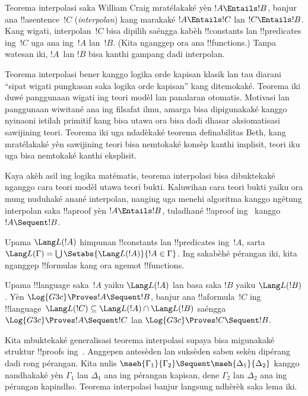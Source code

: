 \documentclass[../../../include/open-logic-section]{subfiles}
\begin{document}


Teorema interpolasi saka William Craig mratélakaké yèn
$!A \Entails !B$, banjur ana !!a{sentence}~$!C$
(\emph{interpolan}) kang marakaké $!A \Entails !C$ lan
$!C \Entails !B$. Kang wigati, interpolan~$!C$ bisa
dipilih saéngga kabèh !!{constant}s lan !!{predicate}s
ing~$!C$ uga ana ing~$!A$ lan~$!B$.
(Kita nganggep ora ana !!{function}s.) Tanpa watesan iki,
$!A$~lan $!B$ bisa kanthi gampang dadi interpolan.

Teorema interpolasi bener kanggo logika orde kapisan klasik
lan tau diarani ``sipat wigati pungkasan saka logika orde
kapisan'' kang ditemokaké. Teorema iki duwé panggunaan
wigati ing teori modèl lan panalaran otomatis.
Motivasi lan panggunaan wiwitané ana ing filsafat ilmu,
amarga bisa dipigunakaké kanggo nyinaoni istilah primitif
kang bisa utawa ora bisa dadi dhasar aksiomatisasi sawijining
teori. Teorema iki uga ndadèkaké teorema definabilitas Beth,
kang mratélakaké yèn sawijining teori bisa nemtokaké konsèp
kanthi implisit, teori iku uga bisa nemtokaké kanthi eksplisit.

Kaya akèh asil ing logika matématis, teorema interpolasi
bisa dibuktekaké nganggo cara teori modèl utawa teori bukti.
Kaluwihan cara teori bukti yaiku ora mung nuduhaké anané
interpolan, nanging uga menehi algoritma kanggo ngétung
interpolan saka !!a{proof} yèn $!A \Entails !B$,
tuladhané !!a{proof} ing~ kanggo
$!A \Sequent !B$.

Upama $\Lang L(!A)$ himpunan !!{constant}s lan
!!{predicate}s ing~$!A$, sarta
$\Lang L(\Gamma) = \bigcup \Setabs{\Lang L(!A)}{!A \in
\Gamma}$. Ing sakabèhé pérangan iki, kita nganggep
!!{formula}s kang ora ngemot !!{function}s.

\begin{thm}
Upama !!{language} saka~$!A$ yaiku $\Lang L(!A)$ lan
basa saka $!B$ yaiku $\Lang L(!B)$.
Yèn $\Log{G3c} \Proves !A \Sequent !B$, banjur ana
!!a{formula}~$!C$ ing !!{language}~$\Lang L(!C) \subseteq \Lang
L(!A) \cap \Lang L(!B)$ saéngga
$\Log{G3c} \Proves !A \Sequent !C$ lan
$\Log{G3c} \Proves !C \Sequent !B$.
\end{thm}

Kita mbuktekaké generalisasi teorema interpolasi supaya bisa
migunakaké struktur !!{proof}s ing~. Anggepen
antesèden lan suksèden saben sekèn dipérang dadi rong
pérangan. Kita nulis
$\maeh{\Gamma_1}{\Gamma_2} \Sequent
\maeh{\Delta_1}{\Delta_2}$ kanggo nandhakaké yèn
$\Gamma_1$ lan $\Delta_1$ ana ing pérangan kapisan,
dene $\Gamma_2$ lan $\Delta_2$ ana ing pérangan kapindho.
Teorema interpolasi banjur langsung ndhèrèk saka lema iki.
\end{document}
